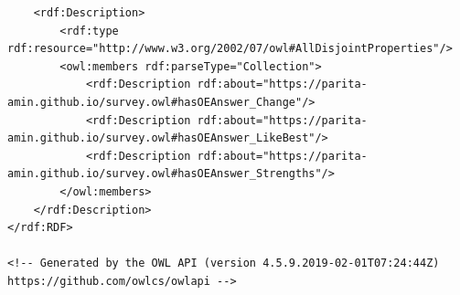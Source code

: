 \begin{lstlisting}
    <rdf:Description>
        <rdf:type rdf:resource="http://www.w3.org/2002/07/owl#AllDisjointProperties"/>
        <owl:members rdf:parseType="Collection">
            <rdf:Description rdf:about="https://parita-amin.github.io/survey.owl#hasOEAnswer_Change"/>
            <rdf:Description rdf:about="https://parita-amin.github.io/survey.owl#hasOEAnswer_LikeBest"/>
            <rdf:Description rdf:about="https://parita-amin.github.io/survey.owl#hasOEAnswer_Strengths"/>
        </owl:members>
    </rdf:Description>
</rdf:RDF>

<!-- Generated by the OWL API (version 4.5.9.2019-02-01T07:24:44Z) https://github.com/owlcs/owlapi -->	
\end{lstlisting}
